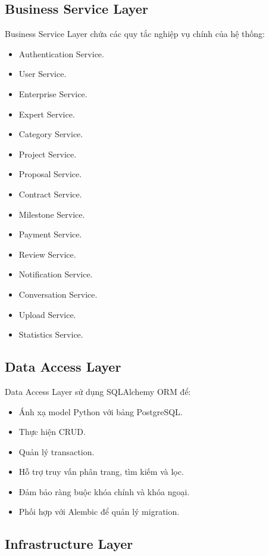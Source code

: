 \subsection{Business Service Layer}

Business Service Layer chứa các quy tắc nghiệp vụ chính của hệ thống:

\begin{itemize}
    \item Authentication Service.
    \item User Service.
    \item Enterprise Service.
    \item Expert Service.
    \item Category Service.
    \item Project Service.
    \item Proposal Service.
    \item Contract Service.
    \item Milestone Service.
    \item Payment Service.
    \item Review Service.
    \item Notification Service.
    \item Conversation Service.
    \item Upload Service.
    \item Statistics Service.
\end{itemize}

\subsection{Data Access Layer}

Data Access Layer sử dụng SQLAlchemy ORM để:

\begin{itemize}
    \item Ánh xạ model Python với bảng PostgreSQL.
    \item Thực hiện CRUD.
    \item Quản lý transaction.
    \item Hỗ trợ truy vấn phân trang, tìm kiếm và lọc.
    \item Đảm bảo ràng buộc khóa chính và khóa ngoại.
    \item Phối hợp với Alembic để quản lý migration.
\end{itemize}

\subsection{Infrastructure Layer}

